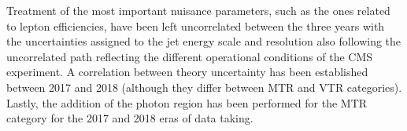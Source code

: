 \hspace{10pt} Treatment of the most important nuisance parameters, such as the ones related to lepton efficiencies, have been left uncorrelated between the three years with the uncertainties assigned to the jet energy scale and resolution also following the uncorrelated path reflecting the different operational conditions of the CMS experiment. A correlation between theory uncertainty has been established between 2017 and 2018 (although they differ between MTR and VTR categories). Lastly, the addition of the photon region has been performed for the MTR category for the 2017 and 2018 eras of data taking.



